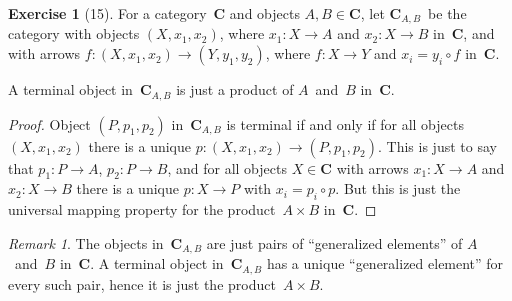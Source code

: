 \documentclass[letterpaper,12pt]{article}
\newcommand{\after}{\circ}
\newcommand{\cat}[1]{\mathbf{#1}}
\newcommand{\2}{\cat{2}}
\newcommand{\C}{\cat{C}}
\theoremstyle{definition}
\newtheorem*{exer}{Exercise}
\theoremstyle{remark}
\newtheorem*{rmk}{Remark}
\theoremstyle{direction}
\begin{document}
\begin{exer}[15]
For a category~\(\C\) and objects \(A,B\in\C\), let \(\C_{A,B}\)~be the category with objects \((X,x_1,x_2)\), where \(x_1:X\to A\) and \(x_2:X\to B\) in~\(\C\), and with arrows \(f:(X,x_1,x_2)\to(Y,y_1,y_2)\), where \(f:X\to Y\) and \(x_i=y_i\after f\) in~\(\C\).

A terminal object in~\(\C_{A,B}\) is just a product of \(A\)~and~\(B\) in~\(\C\).
\end{exer}
\begin{proof}
Object \((P,p_1,p_2)\) in~\(\C_{A,B}\) is terminal if and only if for all objects \((X,x_1,x_2)\) there is a unique \(p:(X,x_1,x_2)\to(P,p_1,p_2)\). This is just to say that \(p_1:P\to A\), \(p_2:P\to B\), and for all objects \(X\in\C\) with arrows \(x_1:X\to A\) and \(x_2:X\to B\) there is a unique \(p:X\to P\) with \(x_i=p_i\after p\). But this is just the universal mapping property for the product~\(A\times B\) in~\(\C\).
\end{proof}
\begin{rmk}
The objects in~\(\C_{A,B}\) are just pairs of ``generalized elements'' of \(A\)~and~\(B\) in~\(\C\). A terminal object in~\(\C_{A,B}\) has a unique ``generalized element'' for every such pair, hence it is just the product~\(A\times B\).
\end{rmk}
\end{document}

